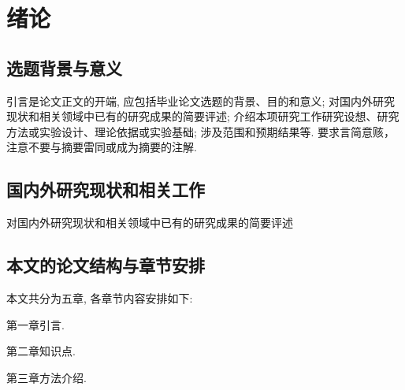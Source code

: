 \documentclass[a4paper]{article}
\begin{document}




\section{绪论}
\subsection{选题背景与意义}
\label{sec:background}
引言是论文正文的开端, 应包括毕业论文选题的背景、目的和意义; 对国内外研究现状和相关领域中已有的研究成果的简要评述; 介绍本项研究工作研究设想、研究方法或实验设计、理论依据或实验基础; 涉及范围和预期结果等. 要求言简意赅，注意不要与摘要雷同或成为摘要的注解.

\subsection{国内外研究现状和相关工作}
\label{sec:related_work}
对国内外研究现状和相关领域中已有的研究成果的简要评述

\subsection{本文的论文结构与章节安排}
\label{sec:arrangement}
本文共分为五章, 各章节内容安排如下:

第一章引言.

第二章知识点.

第三章方法介绍.
\end{document}
